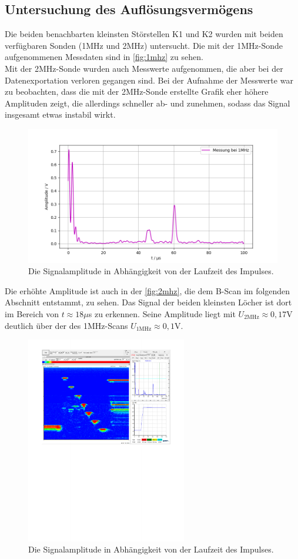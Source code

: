 \subsection{Untersuchung des Auflösungsvermögens}
Die beiden benachbarten kleinsten Störstellen K1 und K2 wurden mit beiden verfügbaren
Sonden (1MHz und 2MHz) untersucht. Die mit der 1MHz-Sonde aufgenommenen Messdaten sind in \autoref{fig:1mhz} zu sehen.\\
Mit der 2MHz-Sonde wurden auch Messwerte aufgenommen, die aber bei der Datenexportation verloren gegangen sind. 
Bei der Aufnahme der Messwerte war zu beobachten, dass die mit der 2MHz-Sonde erstellte Grafik eher höhere 
Amplituden zeigt, die allerdings schneller ab- und zunehmen, sodass das Signal insgesamt etwas instabil wirkt.
\begin{figure}[H]
  \centering
  \includegraphics[width = \textwidth]{content/1mhz_aufl_plot.png}
  \caption{Die Signalamplitude in Abhängigkeit von der Laufzeit des Impulses.}
  \label{fig:1mhz}
\end{figure}
Die erhöhte Amplitude ist auch in der \autoref{fig:2mhz}, die dem B-Scan im folgenden Abschnitt entstammt, zu sehen. Das Signal der beiden kleinsten Löcher 
ist dort im Bereich von $t \approx 18\mu$s zu erkennen. 
Seine Amplitude liegt mit $U_{\mathrm{2MHz}} \approx 0,17$V deutlich über der des 1MHz-Scans $U_{\mathrm{1MHz}} \approx 0,1$V.



\begin{figure}[H]
  \centering
  \includegraphics[width = 7cm]{content/2Mhz.pdf}
  \caption{Die Signalamplitude in Abhängigkeit von der Laufzeit des Impulses.}
  \label{fig:2mhz}
\end{figure}



